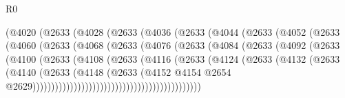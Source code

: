 \begin{lexlean}{R0}
\begin{coremodule}
                        (@4020
                          (@2633
                            (@4028
                              (@2633
                                (@4036
                                  (@2633
                                    (@4044
                                      (@2633
                                        (@4052
                                          (@2633
                                            (@4060
                                              (@2633
                                                (@4068
                                                  (@2633
                                                    (@4076
                                                      (@2633
                                                        (@4084
                                                          (@2633
                                                            (@4092
                                                              (@2633
                                                                (@4100
                                                                  (@2633
                                                                    (@4108
                                                                      (@2633
                                                                        (@4116
                                                                          (@2633
                                                                            (@4124
                                                                              (@2633
                                                                                (@4132
                                                                                  (@2633
                                                                                    (@4140
                                                                                      (@2633
                                                                                        (@4148
                                                                                          (@2633
                                                                                            (@4152
                                                                                              @4154
                                                                                              @2654
                                                                                              @2629)))))))))))))))))))))))))))))))))))))))))))))

\end{coremodule}
\end{lexlean}
